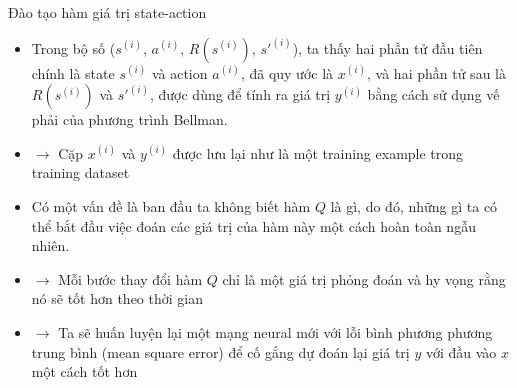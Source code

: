 \documentclass[10pt,aspectratio=169]{beamer}
\begin{document}
\begin{frame}{Đào tạo hàm giá trị state-action}{\subsecname}
\begin{itemize}
\setlength\itemsep{8pt}
\item Trong bộ số \textcolor{mainblue}{($ s^{(i)},\,a^{(i)},\,R(s^{(i)}),\,s'^{(i)} $)}, ta thấy hai phần tử đầu tiên chính là state $ s^{(i)} $ và action $ a^{(i)} $, đã quy ước là $ x^{(i)} $, và hai phần tử sau là $ R(s^{(i)}) $ và $ s'^{(i)} $, được dùng để tính ra giá trị $ y^{(i)} $ bằng cách sử dụng vế phải của phương trình Bellman.
\item[] $ \longrightarrow $ Cặp $ x^{(i)} $ và $ y^{(i)} $ được lưu lại như là một training example trong training dataset
\item Có một vấn đề là ban đầu ta không biết hàm $ Q $ là gì, do đó, những gì ta có thể bắt đầu việc đoán các giá trị của hàm này một cách hoàn toàn ngẫu nhiên.
\item[] $ \longrightarrow $ Mỗi bước thay đổi hàm $ Q $ chỉ là một giá trị phỏng đoán và hy vọng rằng nó sẽ tốt hơn theo thời gian
\item[] $ \longrightarrow $ Ta sẽ huấn luyện lại một mạng neural mới với lỗi bình phương phương trung bình (mean square error) để cố gắng dự đoán lại giá trị $ y $ với đầu vào $ x $ một cách tốt hơn
\end{itemize}
\end{frame}
\end{document}

